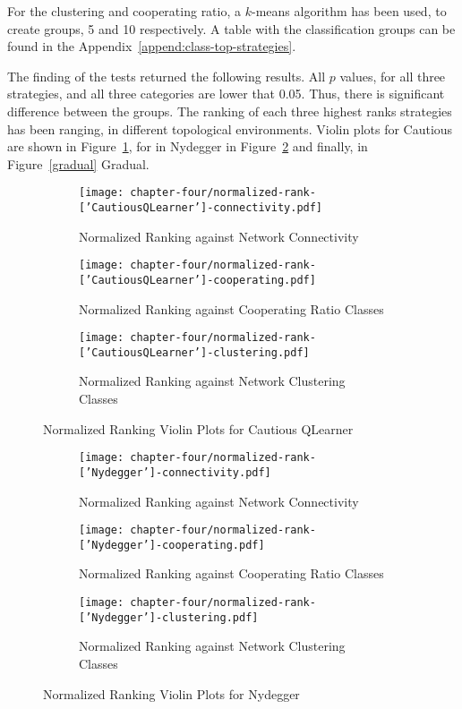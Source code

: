 For the clustering and cooperating ratio, a \(k\)-means algorithm has been used,
to create groups, 5 and 10 respectively. A table with the classification groups
can be found in the Appendix~\ref{append:class-top-strategies}.

The finding of the tests returned the following results. All \(p\) values, for
all three strategies, and all three
categories are lower that 0.05. Thus, there is significant difference between the
groups. The ranking of each three highest ranks strategies has been ranging, in
different topological environments. Violin plots for Cautious are shown
in Figure~\ref{cautious}, for in Nydegger in Figure~\ref{nydegger} and finally,
in Figure~\ref{gradual} Gradual.

\begin{figure}[!hbtp]
	\centering
	\begin{subfigure}[t]{0.70\textwidth}
		\centering
		\texttt{[image: chapter-four/normalized-rank-['CautiousQLearner']-connectivity.pdf]}
		\caption{Normalized Ranking against Network Connectivity}
	\end{subfigure}
	\hfill
	\begin{subfigure}[t]{0.70\textwidth}\centering
		\centering
		\texttt{[image: chapter-four/normalized-rank-['CautiousQLearner']-cooperating.pdf]}
		\caption{Normalized Ranking against Cooperating Ratio Classes}
	\end{subfigure}
	\hfill
	\begin{subfigure}[t]{0.70\textwidth}\centering
		\centering
		\texttt{[image: chapter-four/normalized-rank-['CautiousQLearner']-clustering.pdf]}
		\caption{Normalized Ranking against Network Clustering Classes}
	\end{subfigure}
	\caption{Normalized Ranking Violin Plots for Cautious QLearner}
	\label{cautious}
\end{figure}

\begin{figure}[!hbtp]
	\centering
	\begin{subfigure}[t]{0.70\textwidth}
		\centering
		\texttt{[image: chapter-four/normalized-rank-['Nydegger']-connectivity.pdf]}
		\caption{Normalized Ranking against Network Connectivity}
	\end{subfigure}
	\hfill
	\begin{subfigure}[t]{0.70\textwidth}\centering
		\centering
		\texttt{[image: chapter-four/normalized-rank-['Nydegger']-cooperating.pdf]}
		\caption{Normalized Ranking against Cooperating Ratio Classes}
	\end{subfigure}
	\hfill
	\begin{subfigure}[t]{0.70\textwidth}\centering
		\centering
		\texttt{[image: chapter-four/normalized-rank-['Nydegger']-clustering.pdf]}
		\caption{Normalized Ranking against Network Clustering Classes}
	\end{subfigure}
	\caption{Normalized Ranking Violin Plots for Nydegger}
	\label{nydegger}
\end{figure}

